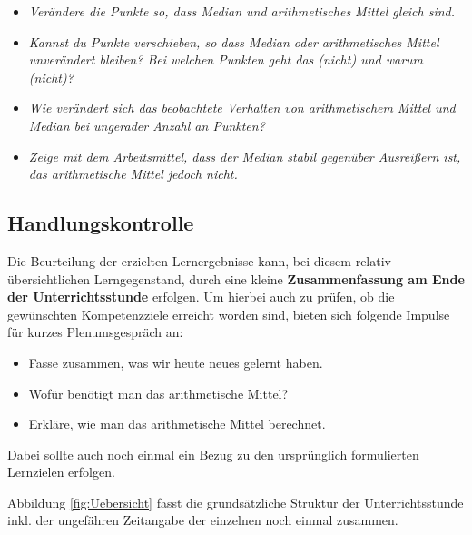 \documentclass[
]{scrbook}
\providecommand{\tightlist}{%
  \setlength{\itemsep}{0pt}\setlength{\parskip}{0pt}}
\theoremstyle{definition}
\theoremstyle{definition}
\theoremstyle{definition}
\theoremstyle{definition}
\theoremstyle{remark}
\begin{document}
\begin{itemize}
\tightlist
\item
  \emph{Verändere die Punkte so, dass Median und arithmetisches Mittel gleich sind.}
\item
  \emph{Kannst du Punkte verschieben, so dass Median oder arithmetisches Mittel unverändert bleiben? Bei welchen Punkten geht das (nicht) und warum (nicht)?}
\item
  \emph{Wie verändert sich das beobachtete Verhalten von arithmetischem Mittel und Median bei ungerader Anzahl an Punkten?}
\item
  \emph{Zeige mit dem Arbeitsmittel, dass der Median stabil gegenüber Ausreißern ist, das arithmetische Mittel jedoch nicht.}
\end{itemize}

\subsection{Handlungskontrolle}\label{handlungskontrolle-1}

Die Beurteilung der erzielten Lernergebnisse kann, bei diesem relativ übersichtlichen Lerngegenstand, durch eine kleine \textbf{Zusammenfassung am Ende der Unterrichtsstunde} erfolgen. Um hierbei auch zu prüfen, ob die gewünschten Kompetenzziele erreicht worden sind, bieten sich folgende Impulse für kurzes Plenumsgespräch an:

\begin{itemize}
\tightlist
\item
  Fasse zusammen, was wir heute neues gelernt haben.\\
\item
  Wofür benötigt man das arithmetische Mittel?
\item
  Erkläre, wie man das arithmetische Mittel berechnet.
\end{itemize}

Dabei sollte auch noch einmal ein Bezug zu den ursprünglich formulierten Lernzielen erfolgen.

Abbildung \ref{fig:Uebersicht} fasst die grundsätzliche Struktur der Unterrichtsstunde inkl. der ungefähren Zeitangabe der einzelnen noch einmal zusammen.
\end{document}
